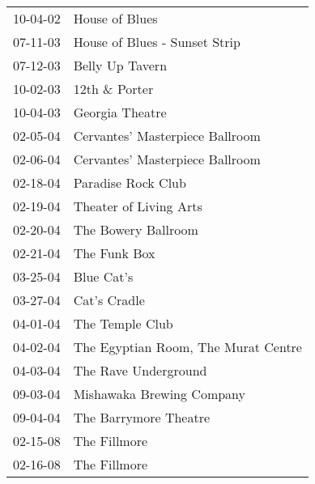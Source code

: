 \begin{supertabular}{p{0.07\textwidth}p{0.23\textwidth}}
 10-04-02 &                       House of Blues \\
 07-11-03 &        House of Blues - Sunset Strip \\
 07-12-03 &                      Belly Up Tavern \\
 10-02-03 &                        12th \& Porter \\
 10-04-03 &                      Georgia Theatre \\
 02-05-04 &      Cervantes' Masterpiece Ballroom \\
 02-06-04 &      Cervantes' Masterpiece Ballroom \\
 02-18-04 &                   Paradise Rock Club \\
 02-19-04 &               Theater of Living Arts \\
 02-20-04 &                  The Bowery Ballroom \\
 02-21-04 &                         The Funk Box \\
 03-25-04 &                           Blue Cat's \\
 03-27-04 &                         Cat's Cradle \\
 04-01-04 &                      The Temple Club \\
 04-02-04 &  The Egyptian Room, The Murat Centre \\
 04-03-04 &                 The Rave Underground \\
 09-03-04 &            Mishawaka Brewing Company \\
 09-04-04 &                The Barrymore Theatre \\
 02-15-08 &                         The Fillmore \\
 02-16-08 &                         The Fillmore \\
\end{supertabular}
